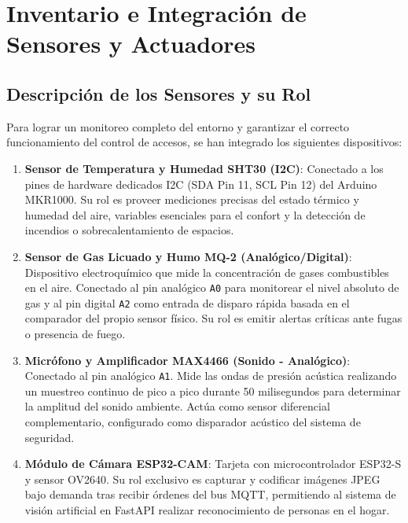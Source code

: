 \documentclass[12pt,letterpaper]{article}
\begin{document}
\newpage
\section{Inventario e Integración de Sensores y Actuadores}

\subsection{Descripción de los Sensores y su Rol}
Para lograr un monitoreo completo del entorno y garantizar el correcto funcionamiento del control de accesos, se han integrado los siguientes dispositivos:
\begin{enumerate}
    \item \textbf{Sensor de Temperatura y Humedad SHT30 (I2C)}: Conectado a los pines de hardware dedicados I2C (SDA Pin 11, SCL Pin 12) del Arduino MKR1000. Su rol es proveer mediciones precisas del estado térmico y humedad del aire, variables esenciales para el confort y la detección de incendios o sobrecalentamiento de espacios.
    \item \textbf{Sensor de Gas Licuado y Humo MQ-2 (Analógico/Digital)}: Dispositivo electroquímico que mide la concentración de gases combustibles en el aire. Conectado al pin analógico \texttt{A0} para monitorear el nivel absoluto de gas y al pin digital \texttt{A2} como entrada de disparo rápida basada en el comparador del propio sensor físico. Su rol es emitir alertas críticas ante fugas o presencia de fuego.
    \item \textbf{Micrófono y Amplificador MAX4466 (Sonido - Analógico)}: Conectado al pin analógico \texttt{A1}. Mide las ondas de presión acústica realizando un muestreo continuo de pico a pico durante 50 milisegundos para determinar la amplitud del sonido ambiente. Actúa como sensor diferencial complementario, configurado como disparador acústico del sistema de seguridad.
    \item \textbf{Módulo de Cámara ESP32-CAM}: Tarjeta con microcontrolador ESP32-S y sensor OV2640. Su rol exclusivo es capturar y codificar imágenes JPEG bajo demanda tras recibir órdenes del bus MQTT, permitiendo al sistema de visión artificial en FastAPI realizar reconocimiento de personas en el hogar.
\end{enumerate}
\end{document}
